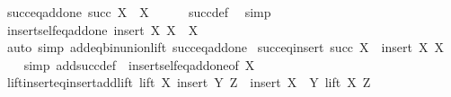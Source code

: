 \begin{isabellebody}
\isamarkupfalse%
\ succ{\isacharunderscore}{\kern0pt}eq{\isacharunderscore}{\kern0pt}add{\isacharunderscore}{\kern0pt}one{\isacharcolon}{\kern0pt}\ {\isachardoublequoteopen}succ\ X\ {\isacharequal}{\kern0pt}\ X\ {\isacharplus}{\kern0pt}\ {}{\isachardoublequoteclose}\isanewline
%
\isadelimproof
\ \ %
\endisadelimproof
%
\isatagproof
{}\isamarkupfalse%
\ succ{\isacharunderscore}{\kern0pt}def\ \isamarkupfalse%
\ simp%
\endisatagproof
{\isafoldproof}%
%
\isadelimproof
\isanewline
%
\endisadelimproof
\isanewline
{}\isamarkupfalse%
\ insert{\isacharunderscore}{\kern0pt}self{\isacharunderscore}{\kern0pt}eq{\isacharunderscore}{\kern0pt}add{\isacharunderscore}{\kern0pt}one{\isacharcolon}{\kern0pt}\ {\isachardoublequoteopen}insert\ X\ X\ {\isacharequal}{\kern0pt}\ X\ {\isacharplus}{\kern0pt}\ {}{\isachardoublequoteclose}\isanewline
%
\isadelimproof
\ \ %
\endisadelimproof
%
\isatagproof
{}\isamarkupfalse%
\ {\isacharparenleft}{\kern0pt}auto\ simp{\isacharcolon}{\kern0pt}\ add{\isacharunderscore}{\kern0pt}eq{\isacharunderscore}{\kern0pt}bin{\isacharunderscore}{\kern0pt}union{\isacharunderscore}{\kern0pt}lift\ succ{\isacharunderscore}{\kern0pt}eq{\isacharunderscore}{\kern0pt}add{\isacharunderscore}{\kern0pt}one{\isacharparenright}{\kern0pt}%
\endisatagproof
{\isafoldproof}%
%
\isadelimproof
\isanewline
%
\endisadelimproof
\isanewline
{}\isamarkupfalse%
\ succ{\isacharunderscore}{\kern0pt}eq{\isacharunderscore}{\kern0pt}insert{\isacharcolon}{\kern0pt}\ {\isachardoublequoteopen}succ\ X\ {\isacharequal}{\kern0pt}\ insert\ X\ X{\isachardoublequoteclose}\isanewline
%
\isadelimproof
\ \ %
\endisadelimproof
%
\isatagproof
{}\isamarkupfalse%
\ {\isacharparenleft}{\kern0pt}simp\ add{\isacharcolon}{\kern0pt}succ{\isacharunderscore}{\kern0pt}def\ \ insert{\isacharunderscore}{\kern0pt}self{\isacharunderscore}{\kern0pt}eq{\isacharunderscore}{\kern0pt}add{\isacharunderscore}{\kern0pt}one{\isacharbrackleft}{\kern0pt}of\ X{\isacharbrackright}{\kern0pt}{\isacharparenright}{\kern0pt}%
\endisatagproof
{\isafoldproof}%
%
\isadelimproof
\isanewline
%
\endisadelimproof
\isanewline
{}\isamarkupfalse%
\ lift{\isacharunderscore}{\kern0pt}insert{\isacharunderscore}{\kern0pt}eq{\isacharunderscore}{\kern0pt}insert{\isacharunderscore}{\kern0pt}add{\isacharunderscore}{\kern0pt}lift{\isacharcolon}{\kern0pt}\ {\isachardoublequoteopen}lift\ X\ {\isacharparenleft}{\kern0pt}insert\ Y\ Z{\isacharparenright}{\kern0pt}\ {\isacharequal}{\kern0pt}\ insert\ {\isacharparenleft}{\kern0pt}X\ {\isacharplus}{\kern0pt}\ Y{\isacharparenright}{\kern0pt}\ {\isacharparenleft}{\kern0pt}lift\ X\ Z{\isacharparenright}{\kern0pt}{\isachardoublequoteclose}\isanewline

\end{isabellebody}
